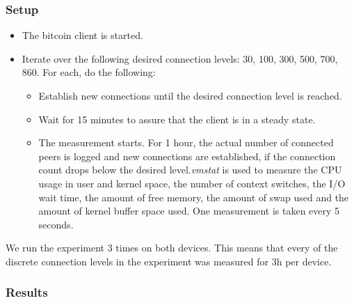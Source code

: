 \subsubsection{Setup}
\begin{itemize}
	\item The bitcoin client is started.
	\item Iterate over the following desired connection levels: 30, 100, 300, 500, 700, 860. For each, do the following:
	\begin{itemize}
	\item Establish new connections until the desired connection level is reached.
	\item Wait for 15 minutes to assure that the client is in a steady state.
	\item The measurement starts. For 1 hour, the actual number of connected peers is logged and new connections are established, if the connection count drops below the desired level.\textit{vmstat} is used to measure the CPU usage in user and kernel space, the number of context switches, the I/O wait time, the amount of free memory, the amount of swap used and the amount of kernel buffer space used. One measurement is taken every 5 seconds.
	\end{itemize}
\end{itemize}
We run the experiment 3 times on both devices. This means that every of the discrete connection levels in the experiment was measured for 3h per device.\\
\subsubsection{Results}




